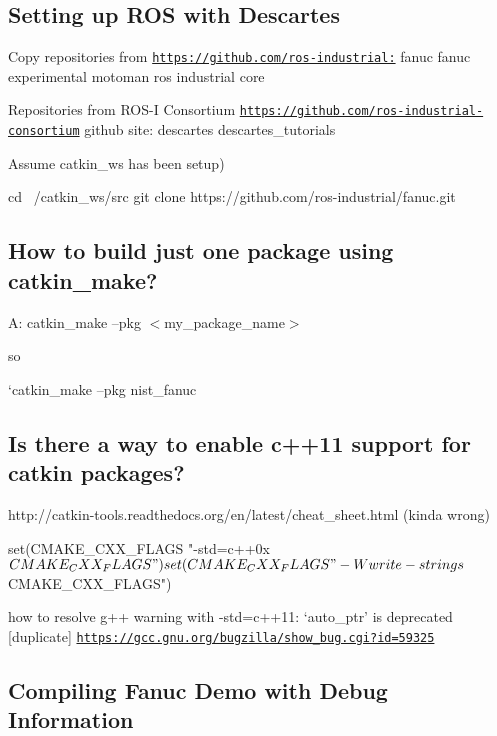\subsection*{Setting up R\-O\-S with Descartes }

Copy repositories from \href{https://github.com/ros-industrial:}{\tt https\-://github.\-com/ros-\/industrial\-:} fanuc fanuc experimental motoman ros industrial core

Repositories from R\-O\-S-\/\-I Consortium \href{https://github.com/ros-industrial-consortium}{\tt https\-://github.\-com/ros-\/industrial-\/consortium} github site\-: descartes descartes\-\_\-tutorials

Assume catkin\-\_\-ws has been setup) \begin{DoxyVerb}cd ~/catkin_ws/src
git clone  https://github.com/ros-industrial/fanuc.git
\end{DoxyVerb}


\subsection*{How to build just one package using catkin\-\_\-make? }

A\-: catkin\-\_\-make --pkg $<$my\-\_\-package\-\_\-name$>$

so \begin{DoxyVerb}`catkin_make --pkg nist_fanuc
\end{DoxyVerb}


\subsection*{Is there a way to enable c++11 support for catkin packages? }

\begin{DoxyVerb}http://catkin-tools.readthedocs.org/en/latest/cheat_sheet.html (kinda wrong)

set(CMAKE_CXX_FLAGS "-std=c++0x ${CMAKE_CXX_FLAGS}")
set(CMAKE_CXX_FLAGS "-Wwrite-strings ${CMAKE_CXX_FLAGS}")
\end{DoxyVerb}


how to resolve g++ warning with -\/std=c++11\-: ‘auto\-\_\-ptr’ is deprecated \mbox{[}duplicate\mbox{]} \href{https://gcc.gnu.org/bugzilla/show_bug.cgi?id=59325}{\tt https\-://gcc.\-gnu.\-org/bugzilla/show\-\_\-bug.\-cgi?id=59325}

\subsection*{Compiling Fanuc Demo with Debug Information }

